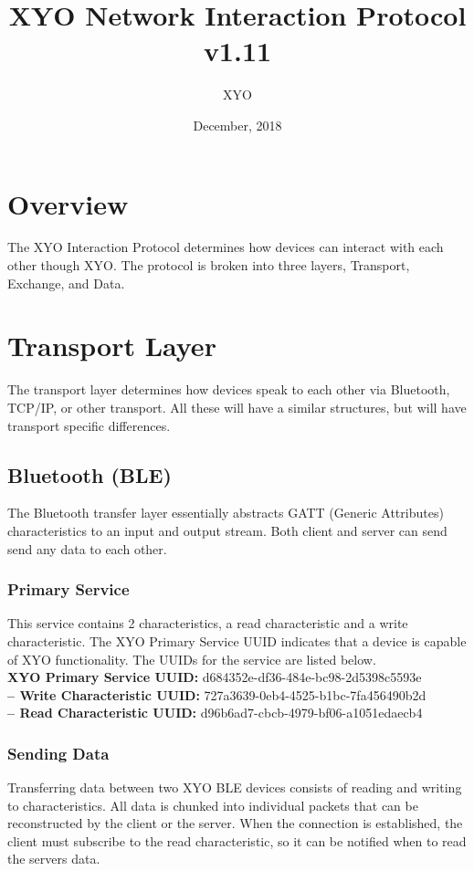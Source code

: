 \documentclass[11pt]{article}
\author{XYO}
\title{XYO Network Interaction Protocol v1.11}
\date{December, 2018}
\begin{document}
\maketitle

\section{Overview}
The XYO Interaction Protocol determines how devices can interact with each other though XYO.
The protocol is broken into three layers, Transport, Exchange, and Data.

\section{Transport Layer}
The transport layer determines how devices speak to each other via Bluetooth, TCP/IP,
or other transport. All these will have a similar structures, but will have transport
specific differences.

\subsection{Bluetooth (BLE)}
The Bluetooth transfer layer essentially abstracts GATT (Generic Attributes) characteristics to an input and output stream. Both client and server can send send any data to each other.

\subsubsection{Primary Service}
This service contains 2 characteristics, a read characteristic and a write characteristic. The XYO Primary Service UUID indicates that a device is capable of XYO functionality. The UUIDs for the service are listed below.\\

\noindent
\textbf{XYO Primary Service UUID:} d684352e-df36-484e-bc98-2d5398c5593e \\
\textbf{-- Write Characteristic UUID:} 727a3639-0eb4-4525-b1bc-7fa456490b2d \\
\textbf{-- Read Characteristic UUID:} d96b6ad7-cbcb-4979-bf06-a1051edaecb4 \\

\subsubsection{Sending Data}
Transferring data between two XYO BLE devices consists of reading and writing to characteristics. All data is chunked into individual packets that can be reconstructed by the client or the server. When the connection is established, the client must subscribe to the read characteristic, so it can be notified when to read the servers data. 
\end{document}
